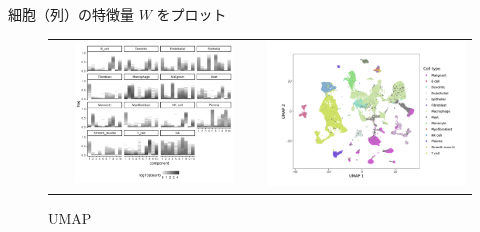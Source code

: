\documentclass[dvipdfmx, dvipsnames]{beamer}
\begin{document}
\begin{frame}

細胞（列）の特徴量 $W$ をプロット

\begin{figure}
\begin{tabular}{cc}
\begin{minipage}{0.45\textwidth}
\includegraphics[width=0.8\textwidth]{img/W_bycelltype}
\caption{NMF}
\end{minipage}
&
\begin{minipage}{0.45\textwidth}
\includegraphics[width=\textwidth]{img/UMAP_celltype.png}
\caption{UMAP}
\end{minipage}
\end{tabular}
\end{figure}
\end{frame}
\end{document}
